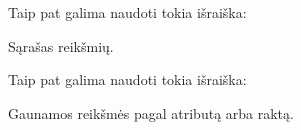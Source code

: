 \documentclass[letterpaper,10pt,lithuanian]{sphinxmanual}
\begin{document}

\begin{fulllineitems}
\label{\detokenize{formules:func.list}}
\pysigstartsignatures
{}
\pysigstopsignatures
\sphinxAtStartPar
Taip pat galima naudoti tokia išraiška:

\begin{sphinxVerbatim}[commandchars=\\\{\}]
\PYG{p}{[}\PYG{p}{]}
\end{sphinxVerbatim}

\sphinxAtStartPar
Sąrašas reikšmių.

\end{fulllineitems}


\begin{fulllineitems}
\label{\detokenize{formules:func.getattr}}
\pysigstartsignatures
{}
\pysigstopsignatures
\sphinxAtStartPar
Taip pat galima naudoti tokia išraiška:

\begin{sphinxVerbatim}[commandchars=\\\{\}]
\end{sphinxVerbatim}

\sphinxAtStartPar
Gaunamos reikšmės pagal atributą arba raktą.

\end{fulllineitems}

\end{document}
